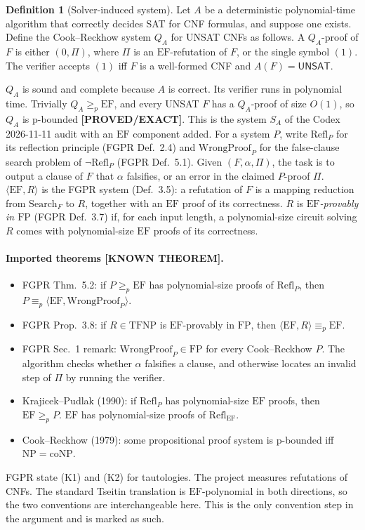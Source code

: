 \documentclass[11pt]{article}
\theoremstyle{definition}
\newtheorem{definition}[theorem]{Definition}
\theoremstyle{remark}
\newcommand{\EF}{\mathrm{EF}}
\newcommand{\FP}{\mathrm{FP}}
\newcommand{\WP}{\mathrm{WrongProof}}
\newcommand{\Refl}{\mathrm{Refl}}
\newcommand{\status}[1]{\textbf{[#1]}}
\begin{document}
\begin{definition}[Solver-induced system]
Let $A$ be a deterministic polynomial-time algorithm that correctly decides SAT for CNF formulas,
and suppose one exists. Define the Cook--Reckhow system $Q_A$ for UNSAT CNFs as follows. A $Q_A$-proof of $F$ is either
$(0,\Pi)$, where $\Pi$ is an $\EF$-refutation of $F$, or the single symbol $(1)$.
The verifier accepts $(1)$ iff $F$ is a well-formed CNF and $A(F)=\textsf{UNSAT}$.
\end{definition}
$Q_A$ is sound and complete because $A$ is correct. Its verifier runs in polynomial time. Trivially $Q_A\ge_p\EF$, and every UNSAT
$F$ has a $Q_A$-proof of size $O(1)$, so $Q_A$ is p-bounded \status{PROVED/EXACT}.
This is the system $S_A$ of the Codex 2026-11-11 audit with an $\EF$ component added.
For a system $P$, write $\Refl_P$ for its reflection principle (FGPR Def.~2.4) and
$\WP_P$ for the false-clause search problem of $\neg\Refl_P$ (FGPR Def.~5.1). Given $(F,\alpha,\Pi)$,
the task is to output a clause of $F$ that $\alpha$ falsifies, or an error in the claimed $P$-proof $\Pi$.
$\langle\EF,R\rangle$ is the FGPR system (Def.~3.5): a refutation of $F$ is a mapping reduction from
$\mathrm{Search}_F$ to $R$, together with an $\EF$ proof of its correctness.
$R$ is \emph{$\EF$-provably in $\FP$} (FGPR Def.~3.7) if, for each input length, a polynomial-size circuit
solving $R$ comes with polynomial-size $\EF$ proofs of its correctness.

\paragraph{Imported theorems \status{KNOWN THEOREM}.}
\begin{itemize}
\item[(K1)] FGPR Thm.~5.2: if $P\ge_p\EF$ has polynomial-size proofs of $\Refl_P$, then
$P\equiv_p\langle\EF,\WP_P\rangle$.
\item[(K2)] FGPR Prop.~3.8: if $R\in\mathrm{TFNP}$ is $\EF$-provably in $\FP$, then $\langle\EF,R\rangle\equiv_p\EF$.
\item[(K3)] FGPR Sec.~1 remark: $\WP_P\in\FP$ for every Cook--Reckhow $P$. The algorithm checks whether $\alpha$
falsifies a clause, and otherwise locates an invalid step of $\Pi$ by running the verifier.
\item[(K4)] Krajicek--Pudlak (1990): if $\Refl_P$ has polynomial-size $\EF$ proofs, then $\EF\ge_p P$.
$\EF$ has polynomial-size proofs of $\Refl_{\EF}$.
\item[(K5)] Cook--Reckhow (1979): some propositional proof system is p-bounded iff $\mathrm{NP}=\mathrm{coNP}$.
\end{itemize}
FGPR state (K1) and (K2) for tautologies. The project measures refutations of CNFs.
The standard Tseitin translation is $\EF$-polynomial in both directions, so the two conventions are interchangeable here.
This is the only convention step in the argument and is marked as such.
\end{document}
